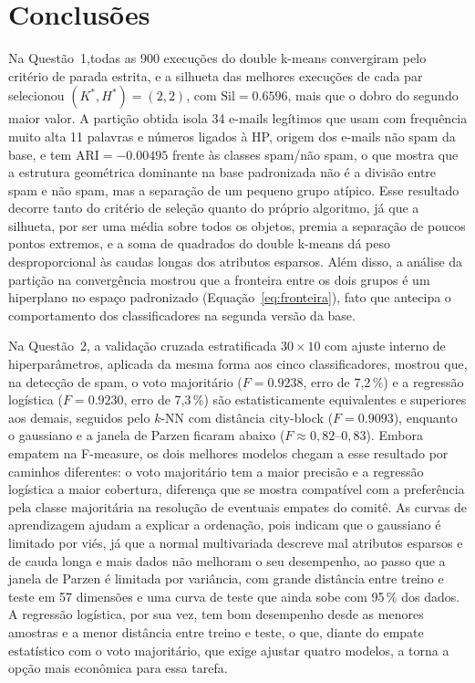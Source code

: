 \documentclass[11pt,a4paper]{article}
\newcommand{\Sil}{\mathrm{Sil}}
\newcommand{\ARI}{\mathrm{ARI}}
\begin{document}
\section{Conclusões}\label{sec:conclusao}

Na Questão~1,todas as 900 execuções do double k-means convergiram pelo critério de parada estrita, e a silhueta das melhores
execuções de cada par selecionou $(K^*,H^*)=(2,2)$, com $\Sil=\num{0.6596}$, mais que o dobro do segundo maior
valor. A partição obtida isola 34 e-mails legítimos que usam com frequência muito alta 11 palavras e números ligados
à HP, origem dos e-mails não spam da base, e tem $\ARI=\num{-0.00495}$ frente às classes spam/não spam, o que mostra
que a estrutura geométrica dominante na base padronizada não é a divisão entre spam e não spam, mas a separação de
um pequeno grupo atípico. Esse resultado decorre tanto do critério de seleção quanto do próprio algoritmo, já que a
silhueta, por ser uma média sobre todos os objetos, premia a separação de poucos pontos extremos, e a soma de
quadrados do double k-means dá peso desproporcional às caudas longas dos atributos esparsos. Além disso, a análise
da partição na convergência mostrou que a fronteira entre os dois grupos é um hiperplano no espaço padronizado
(Equação~\ref{eq:fronteira}), fato que antecipa o comportamento dos classificadores na segunda versão da base.

Na Questão~2, a validação cruzada estratificada $30\times10$ com ajuste interno de hiperparâmetros, aplicada da
mesma forma aos cinco classificadores, mostrou que, na detecção de spam, o voto majoritário ($F=\num{0.9238}$,
erro de 7,2\,\%) e a regressão logística ($F=\num{0.9230}$, erro de 7,3\,\%) são estatisticamente equivalentes e
superiores aos demais, seguidos pelo $k$-NN com distância city-block ($F=\num{0.9093}$), enquanto o gaussiano e a
janela de Parzen ficaram abaixo ($F\approx0{,}82$--$0{,}83$). Embora empatem na F-measure, os dois melhores modelos
chegam a esse resultado por caminhos diferentes: o voto majoritário tem a maior precisão e a regressão logística a
maior cobertura, diferença que se mostra compatível com a preferência pela classe majoritária na resolução de eventuais empates do comitê. 
As curvas de aprendizagem ajudam a explicar a ordenação, pois indicam que o gaussiano é limitado por viés, já que a normal
multivariada descreve mal atributos esparsos e de cauda longa e mais dados não melhoram o seu desempenho, ao passo
que a janela de Parzen é limitada por variância, com grande distância entre treino e teste em 57 dimensões e uma
curva de teste que ainda sobe com 95\,\% dos dados. A regressão logística, por sua vez, tem bom desempenho desde as
menores amostras e a menor distância entre treino e teste, o que, diante do empate estatístico com o voto
majoritário, que exige ajustar quatro modelos, a torna a opção mais econômica para essa tarefa.
\end{document}

